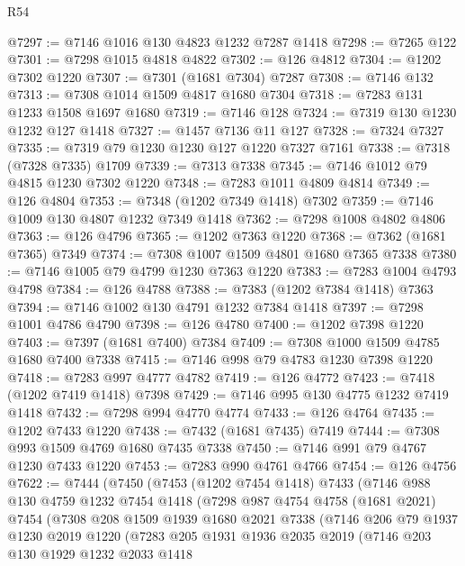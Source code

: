 \begin{lexlean}{R54}
\begin{coremodule}
@7297 := @7146 @1016 @130 @4823 @1232 @7287 @1418
@7298 := @7265 @122
@7301 := @7298 @1015 @4818 @4822
@7302 := @126 @4812
@7304 := @1202 @7302 @1220
@7307 := @7301 (@1681 @7304) @7287
@7308 := @7146 @132
@7313 := @7308 @1014 @1509 @4817 @1680 @7304
@7318 := @7283 @131 @1233 @1508 @1697 @1680
@7319 := @7146 @128
@7324 := @7319 @130 @1230 @1232 @127 @1418
@7327 := @1457 @7136 @11 @127
@7328 := @7324 @7327
@7335 := @7319 @79 @1230 @1230 @127 @1220 @7327 @7161
@7338 := @7318 (@7328 @7335) @1709
@7339 := @7313 @7338
@7345 := @7146 @1012 @79 @4815 @1230 @7302 @1220
@7348 := @7283 @1011 @4809 @4814
@7349 := @126 @4804
@7353 := @7348 (@1202 @7349 @1418) @7302
@7359 := @7146 @1009 @130 @4807 @1232 @7349 @1418
@7362 := @7298 @1008 @4802 @4806
@7363 := @126 @4796
@7365 := @1202 @7363 @1220
@7368 := @7362 (@1681 @7365) @7349
@7374 := @7308 @1007 @1509 @4801 @1680 @7365 @7338
@7380 := @7146 @1005 @79 @4799 @1230 @7363 @1220
@7383 := @7283 @1004 @4793 @4798
@7384 := @126 @4788
@7388 := @7383 (@1202 @7384 @1418) @7363
@7394 := @7146 @1002 @130 @4791 @1232 @7384 @1418
@7397 := @7298 @1001 @4786 @4790
@7398 := @126 @4780
@7400 := @1202 @7398 @1220
@7403 := @7397 (@1681 @7400) @7384
@7409 := @7308 @1000 @1509 @4785 @1680 @7400 @7338
@7415 := @7146 @998 @79 @4783 @1230 @7398 @1220
@7418 := @7283 @997 @4777 @4782
@7419 := @126 @4772
@7423 := @7418 (@1202 @7419 @1418) @7398
@7429 := @7146 @995 @130 @4775 @1232 @7419 @1418
@7432 := @7298 @994 @4770 @4774
@7433 := @126 @4764
@7435 := @1202 @7433 @1220
@7438 := @7432 (@1681 @7435) @7419
@7444 := @7308 @993 @1509 @4769 @1680 @7435 @7338
@7450 := @7146 @991 @79 @4767 @1230 @7433 @1220
@7453 := @7283 @990 @4761 @4766
@7454 := @126 @4756
@7622 := @7444
    (@7450
      (@7453
        (@1202 @7454 @1418)
        @7433
        (@7146
          @988
          @130
          @4759
          @1232
          @7454
          @1418
          (@7298
            @987
            @4754
            @4758
            (@1681 @2021)
            @7454
            (@7308
              @208
              @1509
              @1939
              @1680
              @2021
              @7338
              (@7146
                @206
                @79
                @1937
                @1230
                @2019
                @1220
                (@7283
                  @205
                  @1931
                  @1936
                  @2035
                  @2019
                  (@7146
                    @203
                    @130
                    @1929
                    @1232
                    @2033
                    @1418

\end{coremodule}
\end{lexlean}

